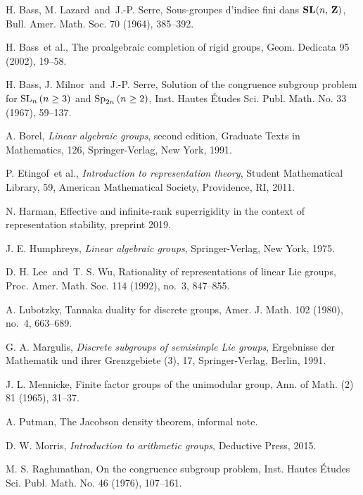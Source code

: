 \documentclass[11pt]{article}
\numberwithin{equation}{section}
\theoremstyle{plain}
\theoremstyle{definition}
\theoremstyle{remark}
\begin{document}
\begin{thebibliography}{CF}
\begin{footnotesize}
\setlength{\itemsep}{-1mm}

H. Bass, M. Lazard\ and\ J.-P. Serre, Sous-groupes d'indice fini dans ${\bf SL}(n,\,{\bf Z})$, Bull. Amer. Math. Soc. 70 (1964), 385--392.

H. Bass\ et al., The proalgebraic completion of rigid groups, Geom. Dedicata 95 (2002), 19--58.

H. Bass, J. Milnor\ and\ J.-P. Serre, Solution of the congruence subgroup problem for ${\rm SL}\sb{n}\,(n\geq 3)$ and ${\rm Sp}\sb{2n}\,(n\geq 2)$, Inst. Hautes \'{E}tudes Sci. Publ. Math. No. 33 (1967), 59--137. 

A. Borel, {\it Linear algebraic groups}, second edition, Graduate Texts in Mathematics, 126, Springer-Verlag, New York, 1991. 

P. Etingof\ et al., {\it Introduction to representation theory}, Student Mathematical Library, 59, American Mathematical Society, Providence, RI, 2011.

N. Harman, Effective and infinite-rank superrigidity in the context of representation stability, preprint 2019.

J. E. Humphreys, {\it Linear algebraic groups}, Springer-Verlag, New York, 1975.

D. H. Lee\ and\ T. S. Wu, Rationality of representations of linear Lie groups, Proc. Amer. Math. Soc. 114 (1992), no.~3, 847--855. 

A. Lubotzky, Tannaka duality for discrete groups, Amer. J. Math. 102 (1980), no.~4, 663--689. 

G. A. Margulis, {\it Discrete subgroups of semisimple Lie groups}, Ergebnisse der Mathematik und ihrer Grenzgebiete (3), 17, Springer-Verlag, Berlin, 1991.

J. L. Mennicke, Finite factor groups of the unimodular group, Ann. of Math. (2) 81 (1965), 31--37.

A. Putman, The Jacobson density theorem, informal note.

D. W. Morris, {\it Introduction to arithmetic groups}, Deductive Press, 2015.

M. S. Raghunathan, On the congruence subgroup problem, Inst. Hautes \'{E}tudes Sci. Publ. Math. No. 46 (1976), 107--161. 


\end{footnotesize}
\end{thebibliography}
\end{document}
